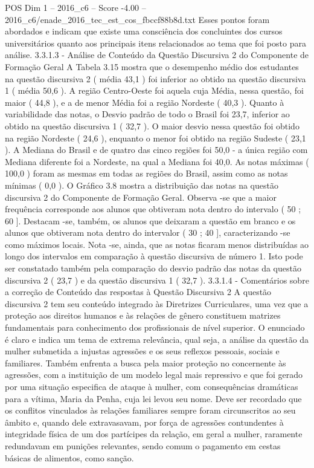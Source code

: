 \begin{textsample}{POS Dim 1 – 2016\_c6 – Score -4.00 – 2016\_c6/enade\_2016\_tec\_est\_cos\_fbccf88b8d.txt}
Esses pontos foram abordados e indicam que existe uma consciência dos concluintes dos cursos universitários quanto aos principais itens relacionados ao tema que foi posto para análise. 3.3.1.3 - Análise de Conteúdo da Questão Discursiva 2 do Componente de Formação Geral A Tabela 3.15 mostra que o desempenho médio dos estudantes na questão discursiva 2 ( média 43,1 ) foi inferior ao obtido na questão discursiva 1 ( média 50,6 ).
A região Centro-Oeste foi aquela cuja Média, nessa questão, foi maior ( 44,8 ), e a de menor Média foi a região Nordeste ( 40,3 ).
Quanto à variabilidade das notas, o Desvio padrão de todo o Brasil foi 23,7, inferior ao obtido na questão discursiva 1 ( 32,7 ).
O maior desvio nessa questão foi obtido na região Nordeste ( 24,6 ), enquanto o menor foi obtido na região Sudeste ( 23,1 ).
A Mediana do Brasil e de quatro das cinco regiões foi 50,0 - a única região com Mediana diferente foi a Nordeste, na qual a Mediana foi 40,0.
As notas máximas ( 100,0 ) foram as mesmas em todas as regiões do Brasil, assim como as notas mínimas ( 0,0 ).
O Gráfico 3.8 mostra a distribuição das notas na questão discursiva 2 do Componente de Formação Geral.
Observa -se que a maior frequência corresponde aos alunos que obtiveram nota dentro do intervalo ( 50 ; 60 ].
Destacam -se, também, os alunos que deixaram a questão em branco e os alunos que obtiveram nota dentro do intervalor ( 30 ; 40 ], caracterizando -se como máximos locais.
Nota -se, ainda, que as notas ficaram menos distribuídas ao longo dos intervalos em comparação à questão discursiva de número 1.
Isto pode ser constatado também pela comparação do desvio padrão das notas da questão discursiva 2 ( 23,7 ) e da questão discursiva 1 ( 32,7 ). 3.3.1.4 - Comentários sobre a correção de Conteúdo das respostas à Questão Discursiva 2 A questão discursiva 2 tem seu conteúdo integrado às Diretrizes Curriculares, uma vez que a proteção aos direitos humanos e às relações de gênero constituem matrizes fundamentais para conhecimento dos profissionais de nível superior.
O enunciado é claro e indica um tema de extrema relevância, qual seja, a análise da questão da mulher submetida a injustas agressões e os seus reflexos pessoais, sociais e familiares.
Também enfrenta a busca pela maior proteção no concernente às agressões, com a instituição de um modelo legal mais repressivo e que foi gerado por uma situação especifica de ataque à mulher, com consequências dramáticas para a vítima, Maria da Penha, cuja lei levou seu nome.
Deve ser recordado que os conflitos vinculados às relações familiares sempre foram circunscritos ao seu âmbito e, quando dele extravasavam, por força de agressões contundentes à integridade física de um dos partícipes da relação, em geral a mulher, raramente redundavam em punições relevantes, sendo comum o pagamento em cestas básicas de alimentos, como sanção.

\end{textsample}
